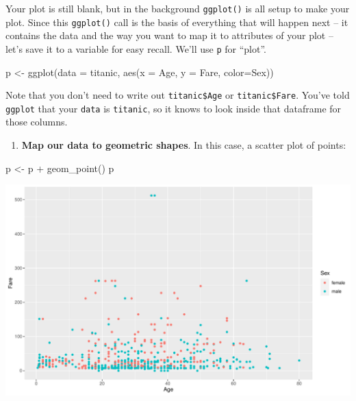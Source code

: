 \documentclass[
]{book}
\newenvironment{Shaded}{\begin{snugshade}}{\end{snugshade}}
\newcommand{\AttributeTok}[1]{\textcolor[rgb]{0.77,0.63,0.00}{#1}}
\newcommand{\FunctionTok}[1]{\textcolor[rgb]{0.00,0.00,0.00}{#1}}
\newcommand{\NormalTok}[1]{#1}
\newcommand{\OtherTok}[1]{\textcolor[rgb]{0.56,0.35,0.01}{#1}}
\newcommand{\SpecialCharTok}[1]{\textcolor[rgb]{0.00,0.00,0.00}{#1}}
\providecommand{\tightlist}{%
  \setlength{\itemsep}{0pt}\setlength{\parskip}{0pt}}
\begin{document}
Your plot is still blank, but in the background \texttt{ggplot()} is all setup to make your plot. Since this \texttt{ggplot()} call is the basis of everything that will happen next -- it contains the data and the way you want to map it to attributes of your plot -- let's save it to a variable for easy recall. We'll use \texttt{p} for ``plot''.

\begin{Shaded}
\begin{Highlighting}[]
\NormalTok{p }\OtherTok{\textless{}{-}} \FunctionTok{ggplot}\NormalTok{(}\AttributeTok{data =}\NormalTok{ titanic, }
       \FunctionTok{aes}\NormalTok{(}\AttributeTok{x =}\NormalTok{ Age, }\AttributeTok{y =}\NormalTok{ Fare, }\AttributeTok{color=}\NormalTok{Sex))}
\end{Highlighting}
\end{Shaded}

Note that you don't need to write out \texttt{titanic\$Age} or \texttt{titanic\$Fare}. You've told \texttt{ggplot} that your \texttt{data} is \texttt{titanic}, so it knows to look inside that dataframe for those columns.

\begin{enumerate}
\def\labelenumi{(\arabic{enumi})}
\setcounter{enumi}{3}
\tightlist
\item
  \textbf{Map our data to geometric shapes}. In this case, a scatter plot of points:
\end{enumerate}

\begin{Shaded}
\begin{Highlighting}[]
\NormalTok{p }\OtherTok{\textless{}{-}}\NormalTok{ p }\SpecialCharTok{+} \FunctionTok{geom\_point}\NormalTok{()}
\NormalTok{p}
\end{Highlighting}
\end{Shaded}

\includegraphics{figures/unnamed-chunk-157-1.pdf}
\end{document}
